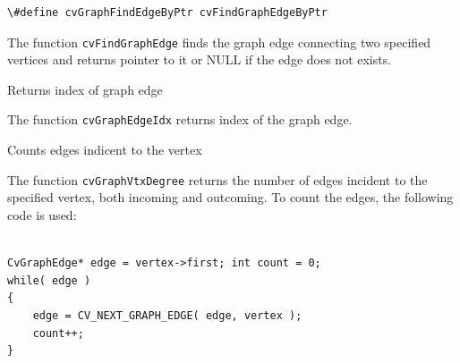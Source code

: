 \begin{lstlisting}
\#define cvGraphFindEdgeByPtr cvFindGraphEdgeByPtr
\end{lstlisting}

\begin{description}
\end{description}

The function \texttt{cvFindGraphEdge} finds the graph edge connecting two specified vertices and returns pointer to it or NULL if the edge does not exists.

\label{GraphEdgeIdx}

Returns index of graph edge


\begin{description}
\end{description}

The function \texttt{cvGraphEdgeIdx} returns index of the graph edge.

\label{GraphVtxDegree}

Counts edges indicent to the vertex


\begin{description}
\end{description}

The function \texttt{cvGraphVtxDegree} returns the number of edges incident to the specified vertex, both incoming and outcoming. To count the edges, the following code is used:

\begin{lstlisting}

CvGraphEdge* edge = vertex->first; int count = 0;
while( edge )
{
    edge = CV_NEXT_GRAPH_EDGE( edge, vertex );
    count++;
}

\end{lstlisting}

